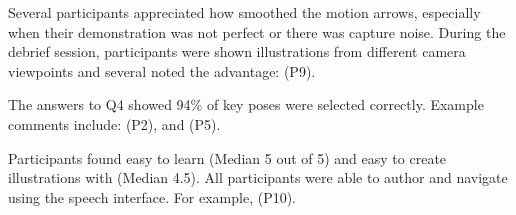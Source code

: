 %
Several participants appreciated how \systemname{} smoothed the motion arrows, especially when their demonstration was not perfect or there was capture noise.
%
During the debrief session, participants were shown  illustrations from different  camera viewpoints and several noted the advantage:  (P9).

The answers to Q4 showed 94\% of key poses were selected correctly. Example comments include:
 (P2), and
 (P5).

Participants found \systemname{} easy to learn (Median 5 out of 5) and easy to create illustrations with (Median 4.5).
%
All participants were able to author and navigate using the speech interface. For example,
 (P10).

